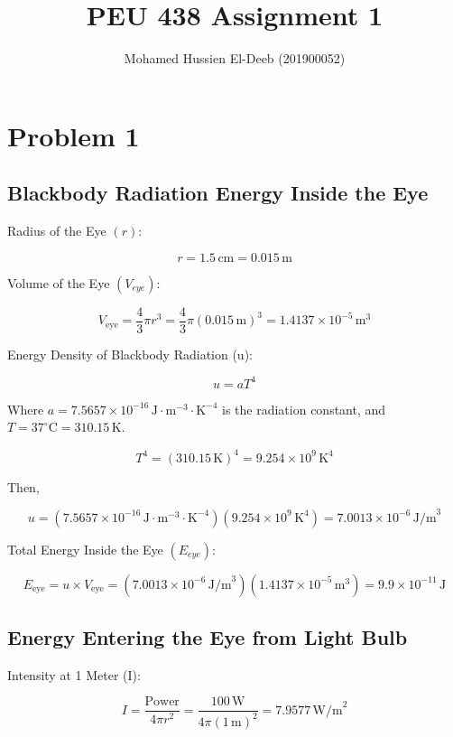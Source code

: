 \documentclass[12pt]{article}
\title{PEU 438 Assignment 1}
\author{Mohamed Hussien El-Deeb (201900052)}
\date{}
\begin{document}
\maketitle
\tableofcontents

\newcommand{\Lagr}{\mathcal{L}}

\newpage

\section{Problem 1}

\subsection{Blackbody Radiation Energy Inside the Eye}

Radius of the Eye $(r)$:

\[
    r = 1.5\, \text{cm} = 0.015\, \text{m}
\]

Volume of the Eye $(V_{eye})$:

\[
    V_{\text{eye}} = \frac{4}{3} \pi r^3
    = \frac{4}{3} \pi {(0.015\, \text{m})}^3 = 1.4137 \times 10^{-5}\, \text{m}^3
\]

Energy Density of Blackbody Radiation (u):

\[
    u = a T^4
\]

Where
\( a = 7.5657 \times 10^{-16}\, \text{J}\cdot\text{m}^{-3}\cdot\text{K}^{-4} \)
is the radiation constant,
and \( T = 37^\circ\text{C} = 310.15\, \text{K} \).

\[
    T^4 = {(310.15\, \text{K})}^4 = 9.254 \times 10^9\, \text{K}^4
\]

Then,

\[
    u =
    (7.5657 \times 10^{-16}\, \text{J}\cdot\text{m}^{-3}\cdot\text{K}^{-4})(9.254 \times 10^9\, \text{K}^4)
    = 7.0013 \times 10^{-6}\, \text{J/m}^3
\]

Total Energy Inside the Eye $(E_{eye})$:

\[
    E_{\text{eye}}
    = u \times V_{\text{eye}}
    = (7.0013 \times 10^{-6}\, \text{J/m}^3)(1.4137 \times 10^{-5}\, \text{m}^3)
    = 9.9 \times 10^{-11}\, \text{J}
\]

\subsection{Energy Entering the Eye from Light Bulb}

Intensity at 1 Meter (I):

\[
    I
    = \frac{\text{Power}}{4\pi r^2}
    = \frac{100\, \text{W}}{4\pi {(1\, \text{m})}^2}
    = 7.9577\, \text{W/m}^2
\]
\end{document}
